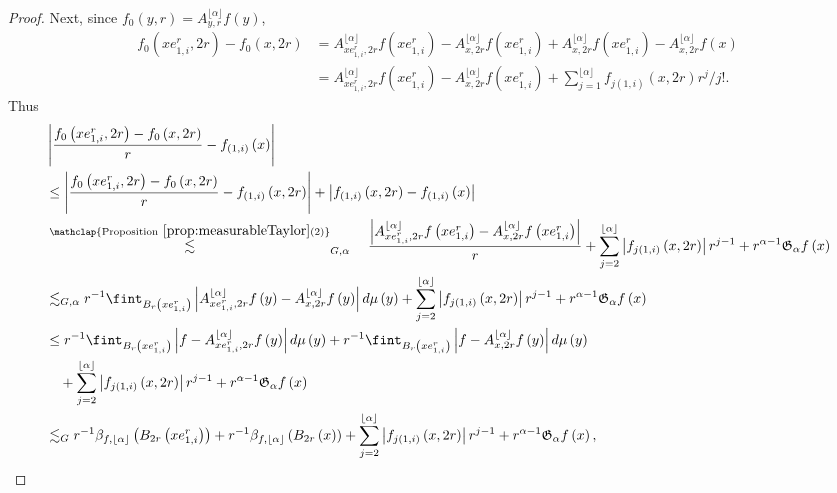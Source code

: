 \documentclass[11pt,reqno]{amsart}
\newcommand{\1}{\mathbf 1}
\begin{document}
\begin{proof}
Next, since $f_0\left(y,r\right)=A_{y,r}^{\lfloor\alpha\rfloor}f\left(y\right)$,
\begin{align*}
    f_0\left(xe_{1,i}^r,2r\right)-f_0\left(x,2r\right)&=A^{\lfloor\alpha\rfloor}_{xe_{1,i}^r,2r}f\left(xe_{1,i}^r\right)-A^{\lfloor\alpha\rfloor}_{x,2r}f\left(xe_{1,i}^r\right)+A^{\lfloor\alpha\rfloor}_{x,2r}f\left(xe_{1,i}^r\right)-A^{\lfloor\alpha\rfloor}_{x,2r}f\left(x\right)\\
    &=A^{\lfloor\alpha\rfloor}_{xe_{1,i}^r,2r}f\left(xe_{1,i}^r\right)-A^{\lfloor\alpha\rfloor}_{x,2r}f\left(xe_{1,i}^r\right)+\sum_{j=1}^{\lfloor\alpha\rfloor}f_{j\left(1,i\right)}\left(x,2r\right)r^j/j!.
\end{align*}
Thus
\begin{align*}
    &\left|\frac{f_0\left(xe_{1,i}^r,2r\right)-f_0\left(x,2r\right)}{r}-f_{\left(1,i\right)}\left(x\right)\right|\\
    &\le \left|\frac{f_0\left(xe_{1,i}^r,2r\right)-f_0\left(x,2r\right)}{r}-f_{\left(1,i\right)}\left(x,2r\right)\right|+\left|f_{\left(1,i\right)}\left(x,2r\right)-f_{\left(1,i\right)}\left(x\right)\right|\\
    & \stackrel{\mathclap{\mathrm{Proposition}~\ref{prop:measurableTaylor}(2)}}{\lesssim}_{G,\alpha}  \quad\frac{\left|A^{\lfloor\alpha\rfloor}_{xe_{1,i}^r,2r}f\left(xe_{1,i}^r\right)-A^{\lfloor\alpha\rfloor}_{x,2r}f\left(xe_{1,i}^r\right)\right|}{r}+\sum_{j=2}^{\lfloor\alpha\rfloor}\left|f_{j\left(1,i\right)}\left(x,2r\right)\right|r^{j-1}+r^{\alpha-1}\mathfrak{G}_\alpha f\left(x\right)\\
    &\lesssim_{G,\alpha} r^{-1}\fint_{B_{r}\left(xe_{1,i}^r\right)}\left|A^{\lfloor\alpha\rfloor}_{xe_{1,i}^r,2r}f\left(y\right)-A^{\lfloor\alpha\rfloor}_{x,2r}f\left(y\right)\right|d\mu\left(y\right)+\sum_{j=2}^{\lfloor\alpha\rfloor}\left|f_{j\left(1,i\right)}\left(x,2r\right)\right|r^{j-1}+r^{\alpha-1}\mathfrak{G}_\alpha f\left(x\right)\\
    &\le r^{-1}\fint_{B_{r}\left(xe_{1,i}^r\right)}\left|f-A^{\lfloor\alpha\rfloor}_{xe_{1,i}^r,2r}f\left(y\right)\right|d\mu\left(y\right)+r^{-1}\fint_{B_{r}\left(xe_{1,i}^r\right)}\left|f-A^{\lfloor\alpha\rfloor}_{x,2r}f\left(y\right)\right|d\mu\left(y\right)\\
    &\quad+\sum_{j=2}^{\lfloor\alpha\rfloor}\left|f_{j\left(1,i\right)}\left(x,2r\right)\right|r^{j-1}+r^{\alpha-1}\mathfrak{G}_\alpha f\left(x\right)\\
    &\lesssim_G r^{-1}\beta_{f,\lfloor\alpha\rfloor}\left(B_{2r}\left(xe_{1,i}^r\right)\right)+r^{-1}\beta_{f,\lfloor\alpha\rfloor}\left(B_{2r}\left(x\right)\right)+\sum_{j=2}^{\lfloor\alpha\rfloor}\left|f_{j\left(1,i\right)}\left(x,2r\right)\right|r^{j-1}+r^{\alpha-1}\mathfrak{G}_\alpha f\left(x\right),

\end{align*}
\end{proof}
\end{document}

